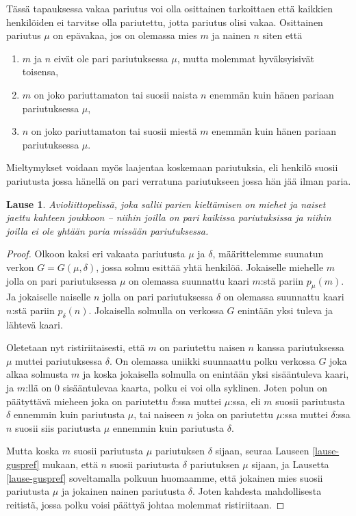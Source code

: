 \documentclass[finnish]{tktltiki2}
\newtheorem{lau}{Lause}
\theoremstyle{definition}
\theoremstyle{remark}
\begin{document}
Tässä tapauksessa vakaa pariutus voi olla osittainen tarkoittaen että kaikkien henkilöiden ei tarvitse olla pariutettu, jotta pariutus olisi vakaa. Osittainen pariutus $\mu$ on epävakaa, jos on olemassa mies $m$ ja nainen $n$ siten että
\begin{enumerate}
	\item $m$ ja $n$ eivät ole pari pariutuksessa $\mu$, mutta molemmat hyväksyisivät toisensa,
	\item $m$ on joko pariuttamaton tai suosii naista $n$ enemmän kuin hänen pariaan pariutuksessa $\mu$,
	\item $n$ on joko pariuttamaton tai suosii miestä $m$ enemmän kuin hänen pariaan pariutuksessa $\mu$.
\end{enumerate} 
Mieltymykset voidaan myös laajentaa koskemaan pariutuksia, eli henkilö suosii pariutusta jossa hänellä on pari verratuna pariutukseen jossa hän jää ilman paria.

\begin{lau}
Avioliittopelissä, joka sallii parien kieltämisen on miehet ja naiset jaettu kahteen joukkoon -- niihin joilla on pari kaikissa pariutuksissa ja niihin joilla ei ole yhtään paria missään pariutuksessa.
\end{lau}

\begin{proof}\cite[p. 27]{gusfield1989stable}
Olkoon kaksi eri vakaata pariutusta $\mu$ ja $\delta$, määrittelemme suunatun verkon $G = G(\mu, \delta)$, jossa solmu esittää yhtä henkilöä. Jokaiselle miehelle $m$ jolla on pari pariutuksessa $\mu$ on olemassa suunnattu kaari $m$:stä pariin $p_{\mu}(m)$. Ja jokaiselle naiselle $n$ jolla on pari pariutuksessa $\delta$ on olemassa suunnattu kaari $n$:stä pariin $p_{\delta}(n)$.
Jokaisella solmulla on verkossa $G$ enintään yksi tuleva ja lähtevä kaari.

Oletetaan nyt ristiriitaisesti, että $m$ on pariutettu naisen $n$ kanssa pariutuksessa $\mu$ muttei pariutuksessa $\delta$. On olemassa uniikki suunnaattu polku verkossa $G$ joka alkaa solmusta $m$ ja koska jokaisella solmulla on enintään yksi sisääntuleva kaari, ja $m$:llä on 0 sisääntulevaa kaarta, polku ei voi olla syklinen. Joten polun on päätyttävä mieheen joka on pariutettu $\delta$:ssa muttei $\mu$:ssa, eli $m$ suosii pariutusta $\delta$ ennemmin kuin pariutusta $\mu$, tai naiseen $n$ joka on pariutettu $\mu$:ssa muttei $\delta$:ssa $n$ suosii siis pariutusta $\mu$ ennemmin kuin pariutusta $\delta$.

Mutta koska $m$ suosii pariutusta $\mu$ pariutuksen $\delta$ sijaan, seuraa Lauseen \ref{lause-guspref} mukaan, että $n$ suosii pariutusta $\delta$ pariutuksen $\mu$ sijaan, ja Lausetta \ref{lause-guspref} soveltamalla polkuun huomaamme, että jokainen mies suosii pariutusta $\mu$ ja jokainen nainen pariutusta $\delta$. Joten kahdesta mahdollisesta reitistä, jossa polku voisi päättyä johtaa molemmat ristiriitaan.
\end{proof}
\end{document}
